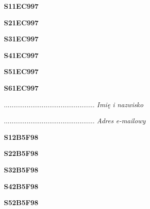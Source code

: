\begin{turn}{90}\huge \textbf{S11EC997}\end{turn}

\begin{turn}{90}\huge \textbf{S21EC997}\end{turn}

\begin{turn}{90}\huge \textbf{S31EC997}\end{turn}

\begin{turn}{90}\huge \textbf{S41EC997}\end{turn}

\begin{turn}{90}\huge \textbf{S51EC997}\end{turn}

\begin{turn}{90}\huge \textbf{S61EC997}\end{turn}

\begin{turn}{90}\begin{minipage}{\linewidth} \vspace{20mm} ................................................  \textit{Imię i nazwisko}\end{minipage}\end{turn}

\begin{turn}{90}\begin{minipage}{\linewidth} \vspace{20mm} ................................................  \textit{Adres e-mailowy}\end{minipage}\end{turn}

\begin{turn}{90}\huge \textbf{S12B5F98}\end{turn}

\begin{turn}{90}\huge \textbf{S22B5F98}\end{turn}

\begin{turn}{90}\huge \textbf{S32B5F98}\end{turn}

\begin{turn}{90}\huge \textbf{S42B5F98}\end{turn}

\begin{turn}{90}\huge \textbf{S52B5F98}\end{turn}

